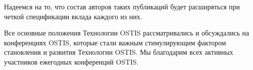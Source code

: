 \begin{SCn}
{Надеемся на то, что состав авторов таких публикаций будет расширяться при четкой спецификации вклада каждого из них. 

Все основные положения Технологии OSTIS рассматривались и обсуждались на конференциях OSTIS, которые стали важным стимулирующим фактором становления и развития Технологии OSTIS. Мы благодарим всех активных участников ежегодных конференций OSTIS.
}

\scnendstruct

\end{SCn}

